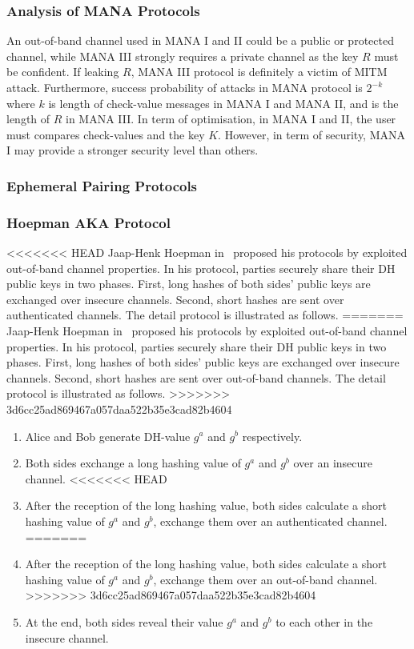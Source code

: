 \subsubsection*{Analysis of MANA Protocols}

An out-of-band channel used in MANA I and II could be a public or protected channel, while MANA III strongly requires a private channel as the key $R$ must be confident. If leaking $R$, MANA III protocol is definitely a victim of MITM attack. Furthermore, success probability of attacks in MANA protocol is $2^{-k}$ where $k$ is length of check-value messages in MANA I and MANA II, and is the length of $R$ in MANA III. In term of optimisation, in MANA I and II, the user must compares check-values and the key $K$. However, in term of security, MANA I may provide a stronger security level than others. 

\subsubsection{Ephemeral Pairing Protocols}
\subsubsection*{Hoepman AKA Protocol}

<<<<<<< HEAD
Jaap-Henk Hoepman in~\cite{Hoepman:2004aa} proposed his protocols by exploited out-of-band channel properties. In his protocol, parties securely share their DH public keys in two phases. First, long hashes of both sides' public keys are exchanged over insecure channels. Second, short hashes are sent over authenticated channels. The detail protocol is illustrated as follows.
=======
Jaap-Henk Hoepman in~\cite{Hoepman:2004aa} proposed his protocols by exploited out-of-band channel properties. In his protocol, parties securely share their DH public keys in two phases. First, long hashes of both sides' public keys are exchanged over insecure channels. Second, short hashes are sent over out-of-band channels. The detail protocol is illustrated as follows.
>>>>>>> 3d6cc25ad869467a057daa522b35e3cad82b4604

\begin{enumerate}
\item Alice and Bob generate DH-value $g^a$ and $g^b$ respectively. 
\item Both sides exchange a long hashing value of $g^a$ and $g^b$ over an insecure channel. 
<<<<<<< HEAD
\item After the reception of the long hashing value, both sides calculate a short hashing value of $g^a$ and $g^b$, exchange them over an authenticated channel. 
=======
\item After the reception of the long hashing value, both sides calculate a short hashing value of $g^a$ and $g^b$, exchange them over an out-of-band channel. 
>>>>>>> 3d6cc25ad869467a057daa522b35e3cad82b4604
\item At the end, both sides reveal their value $g^a$ and $g^b$ to each other in the insecure channel. 
\end{enumerate}

